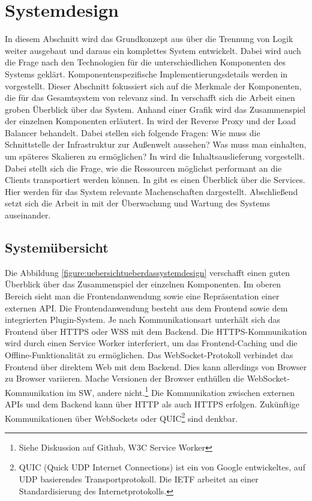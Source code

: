 \section{Systemdesign}
\label{sec:systemdesign}
In diesem Abschnitt wird das Grundkonzept aus 
über die Trennung von Logik weiter ausgebaut und daraus ein komplettes System
entwickelt. Dabei wird auch die Frage nach den Technologien für
die unterschiedlichen Komponenten des Systems geklärt. Komponentenspezifische
Implementierungsdetails werden in  vorgestellt. 
Dieser Abschnitt fokussiert sich auf die Merkmale der Komponenten,
die für das Gesamtsystem von relevanz sind. In  verschafft
sich die Arbeit einen groben Überblick über das System. Anhand einer Grafik wird das Zusammenspiel
der einzelnen Komponenten erläutert. In  
wird der Reverse Proxy und der Load Balancer behandelt.
Dabei stellen sich folgende Fragen: Wie muss die Schnittstelle der
Infrastruktur zur Außenwelt aussehen? Was muss man einhalten, um späteres
Skalieren zu ermöglichen? In  wird
die Inhaltsauslieferung vorgestellt. Dabei stellt sich die Frage,
wie die Ressourcen möglichst performant an die Clients transportiert
werden können. In  gibt es einen Überblick
über die Services. Hier werden für das System relevante Machenschaften
dargestellt. Abschließend setzt sich die Arbeit in 
mit der Überwachung und Wartung des Systems auseinander.

\subsection{Systemübersicht}
\label{subsec:systemuebersicht}
Die Abbildung \ref{figure:uebersichtueberdassystemdesign} verschafft einen guten Überblick
über das Zusammenspiel der einzelnen Komponenten. Im oberen Bereich sieht man die
Frontendanwendung sowie eine Repräsentation einer externen API. Die Frontendanwendung
besteht aus dem Frontend sowie dem integrierten Plugin-System. Je nach Kommunikationsart
unterhält sich das Frontend über HTTPS oder WSS mit dem Backend. Die HTTPS-Kommunikation
wird durch einen Service Worker interferiert, um das Frontend-Caching und die
Offline-Funktionalität zu ermöglichen. Das WebSocket-Protokoll verbindet das Frontend
über direktem Web mit dem Backend. Dies kann allerdings von Browser zu Browser variieren.
Mache Versionen der Browser enthüllen die WebSocket-Kommunikation im SW, andere
nicht.\footnote{Siehe Diskussion auf Github, W3C Service Worker\cite{GithubIssueWebSocketExpose}}
Die Kommunikation zwischen externen APIs und dem Backend kann über HTTP als auch
HTTPS erfolgen. Zukünftige Kommunikationen über WebSockets oder QUIC\footnote{QUIC (Quick UDP Internet Connections) ist ein von Google entwickeltes, auf UDP basierendes Transportprotokoll.\cite{IETFQUICWhatsHappening} Die IETF arbeitet an einer Standardisierung des Internetprotokolls.\cite{DatatrakcerIETFQuic}}
sind denkbar.

